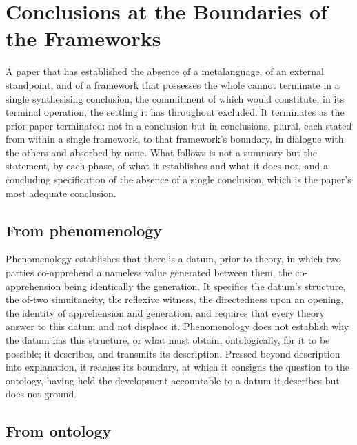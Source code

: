 \section{Conclusions at the Boundaries of the Frameworks}
\label{p10:sec:conclusions}

\noindent
A paper that has established the absence of a metalanguage, of an external standpoint, and of a framework that possesses the whole cannot terminate in a single synthesising conclusion, the commitment of which would constitute, in its terminal operation, the settling it has throughout excluded. It terminates as the prior paper terminated: not in a conclusion but in conclusions, plural, each stated from within a single framework, to that framework's boundary, in dialogue with the others and absorbed by none. What follows is not a summary but the statement, by each phase, of what it establishes and what it does not, and a concluding specification of the absence of a single conclusion, which is the paper's most adequate conclusion.

\subsection{From phenomenology}
\label{p10:sec:concl-phenom}

Phenomenology establishes that there is a datum, prior to theory, in which two parties co-apprehend a nameless value generated between them, the co-apprehension being identically the generation. It specifies the datum's structure, the of-two simultaneity, the reflexive witness, the directedness upon an opening, the identity of apprehension and generation, and requires that every theory answer to this datum and not displace it. Phenomenology does not establish why the datum has this structure, or what must obtain, ontologically, for it to be possible; it describes, and transmits its description. Pressed beyond description into explanation, it reaches its boundary, at which it consigns the question to the ontology, having held the development accountable to a datum it describes but does not ground.

\subsection{From ontology}
\label{p10:sec:concl-onto}

